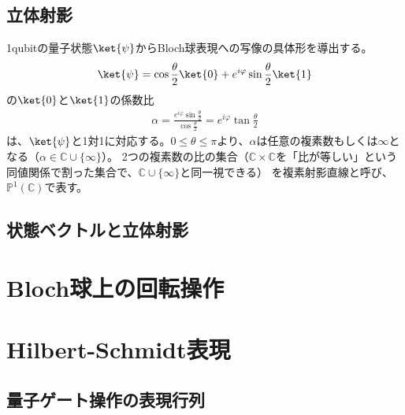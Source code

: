 \documentclass[a4paper,11pt,uplatex]{jsarticle}%
\begin{document}
\subsection{立体射影}
1qubitの量子状態$\ket{\psi}$からBloch球表現への写像の具体形を導出する。
\begin{equation}
  \ket{\psi}=\cos\frac{\theta}{2}\ket{0}+e^{i\varphi}\sin\frac{\theta}{2}\ket{1}
\end{equation}
の$\ket{0}$と$\ket{1}$の係数比
\begin{eqnarray}
  \alpha=\frac{e^{i\varphi}\sin\frac{\theta}{2}}{\cos\frac{\theta}{2}} = e^{i\varphi}\tan\frac{\theta}{2}
\end{eqnarray}
は、$\ket{\psi}$と1対1に対応する。$0\leq\theta\leq\pi$より、$\alpha$は任意の複素数もしくは$\infty$となる（$\alpha\in\mathbb{C}\cup\{\infty\}$）。
2つの複素数の比の集合（$\mathbb{C}\times\mathbb{C}$を「比が等しい」という同値関係で割った集合で、$\mathbb{C}\cup\{\infty\}$と同一視できる）
を複素射影直線と呼び、$\mathbb{P}^1(\mathbb{C})$で表す。

\subsection{状態ベクトルと立体射影}

\section{Bloch球上の回転操作}

\section{Hilbert-Schmidt表現}

\subsection{量子ゲート操作の表現行列}
\end{document}
